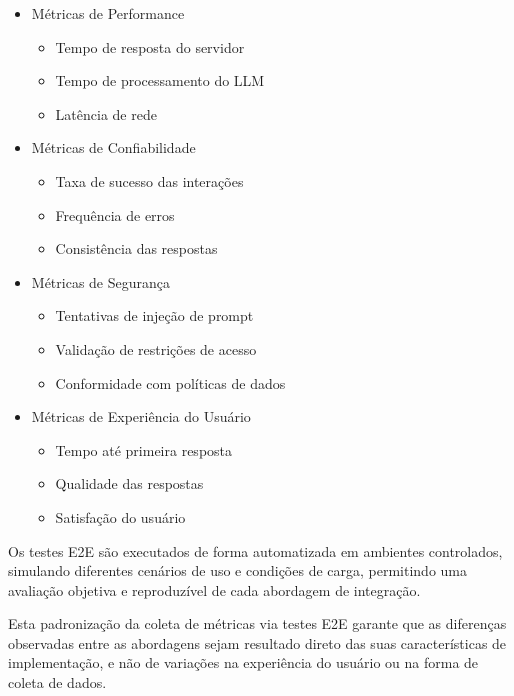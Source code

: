 \documentclass[
]{article}
\providecommand{\tightlist}{%
  \setlength{\itemsep}{0pt}\setlength{\parskip}{0pt}}
\begin{document}
\begin{itemize}
\item
  Métricas de Performance

  \begin{itemize}
  \tightlist
  \item
    Tempo de resposta do servidor
  \item
    Tempo de processamento do LLM
  \item
    Latência de rede
  \end{itemize}
\item
  Métricas de Confiabilidade

  \begin{itemize}
  \tightlist
  \item
    Taxa de sucesso das interações
  \item
    Frequência de erros
  \item
    Consistência das respostas
  \end{itemize}
\item
  Métricas de Segurança

  \begin{itemize}
  \tightlist
  \item
    Tentativas de injeção de prompt
  \item
    Validação de restrições de acesso
  \item
    Conformidade com políticas de dados
  \end{itemize}
\item
  Métricas de Experiência do Usuário

  \begin{itemize}
  \tightlist
  \item
    Tempo até primeira resposta
  \item
    Qualidade das respostas
  \item
    Satisfação do usuário
  \end{itemize}
\end{itemize}

Os testes E2E são executados de forma automatizada em ambientes
controlados, simulando diferentes cenários de uso e condições de carga,
permitindo uma avaliação objetiva e reproduzível de cada abordagem de
integração.

Esta padronização da coleta de métricas via testes E2E garante que as
diferenças observadas entre as abordagens sejam resultado direto das
suas características de implementação, e não de variações na experiência
do usuário ou na forma de coleta de dados.
\end{document}
